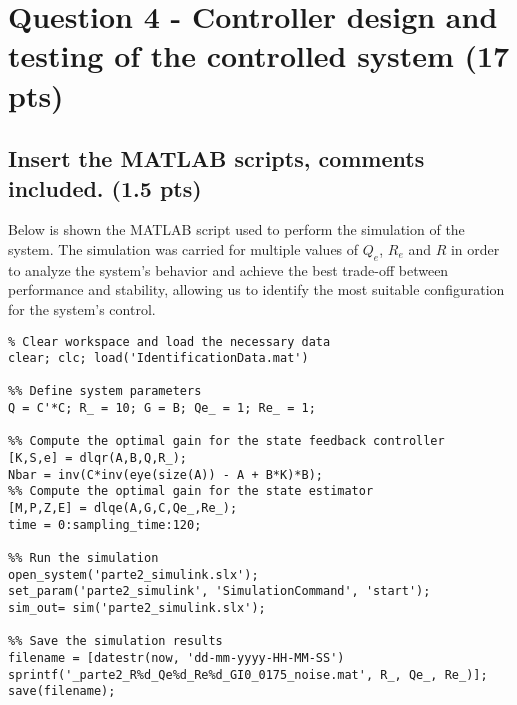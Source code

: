 \section{Question 4 - Controller design and testing of the controlled system (17 pts)}
\label{sec:q4}

\subsection{Insert the MATLAB scripts, comments included. (1.5 pts)}
\vspace{10pt}


Below is shown the MATLAB script used to perform the simulation of the system. The simulation was carried for multiple values of $Q_{e}$, $R_{e}$ and $R$ in order to analyze the system's behavior and achieve the best trade-off between performance and stability, allowing us to identify the most suitable configuration for the system's control.

\begin{lstlisting}
% Clear workspace and load the necessary data
clear; clc; load('IdentificationData.mat')

%% Define system parameters
Q = C'*C; R_ = 10; G = B; Qe_ = 1; Re_ = 1;

%% Compute the optimal gain for the state feedback controller
[K,S,e] = dlqr(A,B,Q,R_);
Nbar = inv(C*inv(eye(size(A)) - A + B*K)*B);
%% Compute the optimal gain for the state estimator
[M,P,Z,E] = dlqe(A,G,C,Qe_,Re_);
time = 0:sampling_time:120;

%% Run the simulation
open_system('parte2_simulink.slx');
set_param('parte2_simulink', 'SimulationCommand', 'start');
sim_out= sim('parte2_simulink.slx');

%% Save the simulation results
filename = [datestr(now, 'dd-mm-yyyy-HH-MM-SS') sprintf('_parte2_R%d_Qe%d_Re%d_GI0_0175_noise.mat', R_, Qe_, Re_)];
save(filename);
\end{lstlisting}
